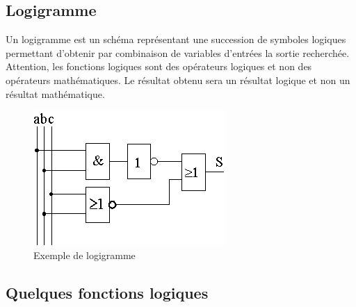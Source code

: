 \documentclass[10pt,fleqn]{article} %
\begin{document}
\subsection{Logigramme}
\begin{definition}
  Un logigramme est un schéma représentant une succession de symboles logiques permettant d’obtenir par combinaison de
variables d’entrées la sortie recherchée. Attention, les fonctions logiques sont des opérateurs logiques et non des opérateurs
mathématiques. Le résultat obtenu sera un résultat logique et non un résultat mathématique.
\end{definition}
\begin{figure}[h]
  \centering
  \includegraphics[width=.5\textwidth]{images/logigramme}
  \caption{Exemple de logigramme}
  \label{}
\end{figure}
\pagebreak
\subsection{Quelques fonctions logiques}
\end{document}
